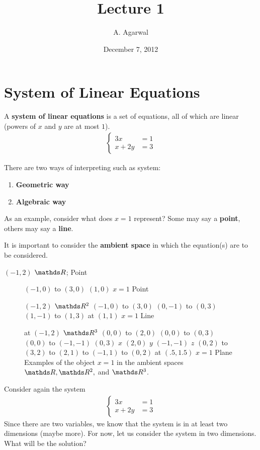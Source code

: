 \documentclass[11pt]{article}
\title{Lecture 1}
\author{A. Agarwal}
\date{December 7, 2012}
\newcommand{\keyphrase}{\textbf}
\begin{document}

\section*{System of Linear Equations}

A \keyphrase{system of linear equations} is a set of equations, all of which are linear (powers of $x$ and $y$ are at most $1$).
\begin{align*}
\left\{\begin{aligned}
3x &= 1
\\
x + 2y &= 3
\end{aligned}
\right.
\end{align*}

There are two ways of interpreting such as system:
\begin{enumerate}
\item{
\textbf{Geometric way}
}
\item{
\textbf{Algebraic way}
}
\end{enumerate}

As an example, consider what does $x=1$ represent? Some may say a \keyphrase{point}, others may say a \keyphrase{line}.

It is important to consider the \keyphrase{ambient space} in which the equation(s) are to be considered.

$(-1, 2)$ {$\bbR$};
Point

\begin{figure}
\centering
$(-1,0)$ to $(3,0)$
$(1, 0)$ $x=1$ 
Point
\end{figure}

\begin{figure}
\centering
$(-1, 2)$ {$\bbR^2$}
$(-1, 0)$ to $(3, 0)$
$(0, -1)$ to $(0, 3)$
$(1,-1)$ to $(1,3)$
at $(1, 1)$ $x=1$
Line
\end{figure}

\begin{figure}
\centering
at $(-1, 2)$ {$\bbR^3$}
$(0,0)$ to $(2,0)$
$(0,0)$ to $(0,3)$
$(0,0)$ to $(-1,-1)$
$(0,3)$  $x$
$(2,0)$  $y$
$(-1, -1)$  $z$
$(0,2)$ to $(3,2)$ to $(2,1)$ to $(-1,1)$ to $(0,2)$
at $(.5, 1.5)$ $x=1$
Plane
Examples of the object $x=1$ in the ambient spaces $\bbR, \bbR^2,$ and $\bbR^3$.
\end{figure}

Consider again the system
\begin{align}
\left\{\begin{aligned}
3x &= 1
\\
x + 2y &= 3
\end{aligned}
\right.
\label{eq:system1}
\end{align}
Since there are two variables, we know that the system is in at least two dimensions (maybe more). For now, let us consider the system in two dimensions. What will be the solution?
\end{document}
